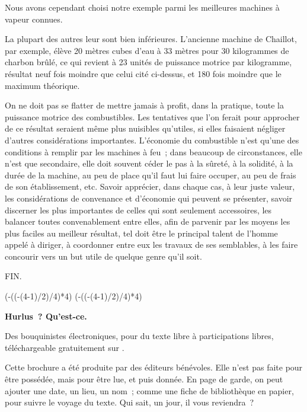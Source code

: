 \documentclass[french,twoside]{book} %
\newcommand{\trailer}[1]{{\Centering\bigskip #1\par}} %
\def\truncdiv#1#2{((#1-(#2-1)/2)/#2)}
\def\moduloop#1#2{(#1-\truncdiv{#1}{#2}*#2)}
\def\modulo#1#2{\number\numexpr\moduloop{#1}{#2}\relax}
\begin{document}
Nous avons cependant choisi notre exemple parmi les meilleures machines à vapeur connues.\par
La plupart des autres leur sont bien inférieures. L’ancienne machine de Chaillot, par exemple, élève 20 mètres cubes d’eau à 33 mètres pour 30 kilogrammes de charbon brûlé, ce qui revient à 23 unités de puissance motrice par kilogramme, résultat neuf fois moindre que celui cité ci-dessus, et 180 fois moindre que le maximum théorique.\par
On ne doit pas se flatter de mettre jamais à profit, dans la pratique, toute la puissance motrice des combustibles. Les tentatives que l’on ferait pour approcher de ce résultat seraient même plus nuisibles qu’utiles, si elles faisaient négliger d’autres considérations importantes. L’économie du combustible n’est qu’une des conditions à remplir par les machines à feu ; dans beaucoup de circonstances, elle n’est que secondaire, elle doit souvent céder le pas à la sûreté, à la solidité, à la durée de la machine, au peu de place qu’il faut lui faire occuper, au peu de frais de son établissement, etc. Savoir apprécier, dans chaque cas, à leur juste valeur, les considérations de convenance et d’économie qui peuvent se présenter, savoir discerner les plus importantes de celles qui sont seulement accessoires, les balancer toutes convenablement entre elles, afin de parvenir par les moyens les plus faciles au meilleur résultat, tel doit être le principal talent de l’homme appelé à diriger, à coordonner entre eux les travaux de ses semblables, à les faire concourir vers un but utile de quelque genre qu’il soit.\par

\trailer{FIN.}
 


\ifbooklet
  \pagestyle{empty}
  \clearpage
  \ifnum\modulo{\value{page}}{4}=0 \hbox{}\newpage\hbox{}\newpage\fi
  \ifnum\modulo{\value{page}}{4}=1 \hbox{}\newpage\hbox{}\newpage\fi


  \hbox{}\newpage
  \ifodd\value{page}\hbox{}\newpage\fi
  {\centering\color{rubric}\bfseries\noindent\large
    Hurlus ? Qu’est-ce.\par
    \bigskip
  }
  \noindent Des bouquinistes électroniques, pour du texte libre à participations libres,
  téléchargeable gratuitement sur \href{https://hurlus.fr}{}.\par
  \bigskip
  \noindent Cette brochure a été produite par des éditeurs bénévoles.
  Elle n’est pas faite pour être possédée, mais pour être lue, et puis donnée.
  En page de garde, on peut ajouter une date, un lieu, un nom ;
  comme une fiche de bibliothèque en papier,
  pour suivre le voyage du texte. Qui sait, un jour, il vous reviendra ?
  \par
\end{document}

